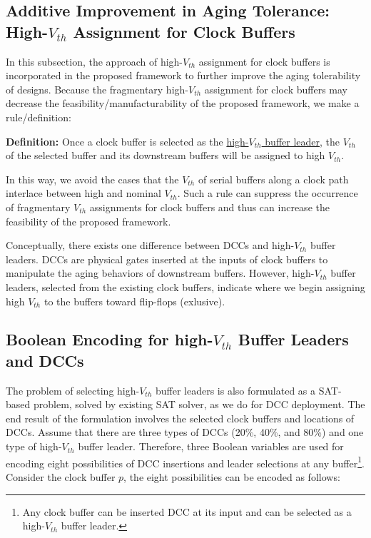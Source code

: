 \subsection{Additive Improvement in Aging Tolerance: High-$V_{th}$ Assignment for Clock Buffers}
\label{sec:VTA}
In this subsection, the approach of high-$V_{th}$ assignment for clock buffers is incorporated in the proposed framework to further improve the aging tolerability of designs. Because the fragmentary high-$V_{th}$ assignment for clock buffers may decrease the feasibility/manufacturability of the proposed framework, we make a rule/definition: 

\noindent \textbf{Definition:} Once a clock buffer is selected as the \uline{high-$V_{th}$ buffer leader}, the $V_{th}$ of the selected buffer and its downstream buffers will be assigned to high $V_{th}$.

In this way, we avoid the cases that the $V_{th}$ of serial buffers along a clock path interlace between high and nominal $V_{th}$. Such a rule can suppress the occurrence of fragmentary $V_{th}$ assignments for clock buffers and thus can increase the feasibility of the proposed framework.

Conceptually, there exists one difference between DCCs and high-$V_{th}$ buffer leaders. DCCs are physical gates inserted at the inputs of clock buffers to manipulate the aging behaviors of downstream buffers. However, high-$V_{th}$ buffer leaders, selected from the existing clock buffers, indicate where we begin assigning high $V_{th}$ to the buffers toward flip-flops (exlusive).

\subsection{Boolean Encoding for high-$V_{th}$ Buffer Leaders and DCCs}
The problem of selecting high-$V_{th}$ buffer leaders is also formulated as a SAT-based problem, solved by existing SAT solver, as we do for DCC deployment. The end result of the formulation involves the selected clock buffers and locations of DCCs. Assume that there are three types of DCCs (20\%, 40\%, and 80\%) and one type of high-$V_{th}$ buffer leader. Therefore, three Boolean variables are used for encoding eight possibilities of DCC insertions and leader selections at any buffer\footnote{Any clock buffer can be inserted DCC at its input and can be selected as a high-$V_{th}$ buffer leader.}. Consider the clock buffer $p$, the eight possibilities can be encoded as follows:


